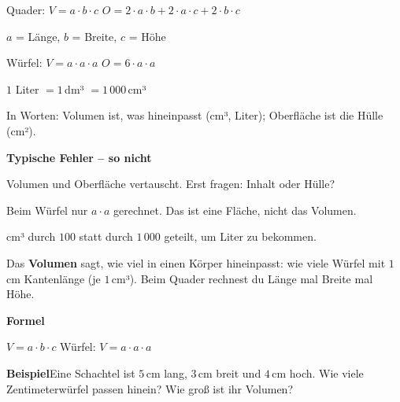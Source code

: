 \documentclass[11pt]{article}
\newcommand{\nr}[1]{\makebox[7mm][l]{\textbf{#1}}}
\begin{document}
\begin{tcolorbox}[colback=mbkasten,colframe=mbgrau,boxrule=0.5pt,arc=1mm,left=3mm,right=3mm,top=2mm,bottom=2mm,title={\bfseries Formel auf einen Blick},coltitle=black,colbacktitle=black!10]
{\Large Quader: $V = a \cdot b \cdot c$ \qquad $O = 2 \cdot a \cdot b + 2 \cdot a \cdot c + 2 \cdot b \cdot c$\par {\small $a$ = Länge, $b$ = Breite, $c$ = Höhe}\par Würfel: $V = a \cdot a \cdot a$ \qquad $O = 6 \cdot a \cdot a$\par $1$ Liter $= 1$\,dm³ $= 1\,000$\,cm³}\par\medskip
In Worten: Volumen ist, was hineinpasst (cm³, Liter); Oberfläche ist die Hülle (cm²).\par\medskip
\end{tcolorbox}
\medskip\noindent\textbf{Typische Fehler – so nicht}\par\smallskip
\noindent\nr{$\times$}Volumen und Oberfläche vertauscht. Erst fragen: Inhalt oder Hülle?\par
\noindent\nr{$\times$}Beim Würfel nur $a \cdot a$ gerechnet. Das ist eine Fläche, nicht das Volumen.\par
\noindent\nr{$\times$}cm³ durch $100$ statt durch $1\,000$ geteilt, um Liter zu bekommen.\par
\clearpage\label{s:A}\noindent\colorbox{black!12}{}\hspace{3mm}{\Large\bfseries Volumen von Quader und Würfel}\par\smallskip
\noindent Das \textbf{Volumen} sagt, wie viel in einen Körper hineinpasst: wie viele Würfel mit $1$\,cm Kantenlänge (je $1$\,cm³). Beim Quader rechnest du Länge mal Breite mal Höhe.\par\medskip
\noindent\textbf{Formel}\par\nopagebreak\noindent\hspace*{4mm}\begin{minipage}{\dimexpr\linewidth-4mm\relax}$V = a \cdot b \cdot c$ \qquad Würfel: $V = a \cdot a \cdot a$\end{minipage}\par\medskip
\noindent\textbf{Beispiel}\quad Eine Schachtel ist $5$\,cm lang, $3$\,cm breit und $4$\,cm hoch. Wie viele Zentimeterwürfel passen hinein? Wie groß ist ihr Volumen?\par\smallskip
\end{document}
